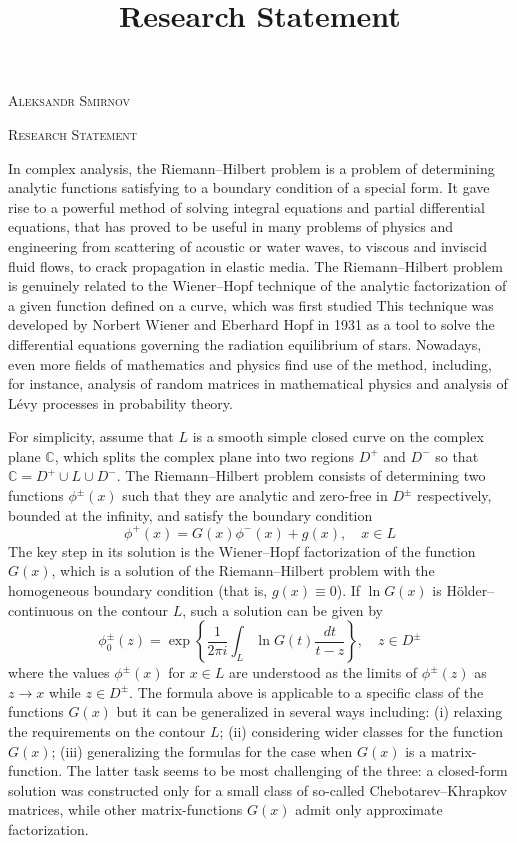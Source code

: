 \documentclass[11pt]{amsart}
\title{Research Statement}
\begin{document}
\begin{center}
	\textsc{Aleksandr Smirnov}
    
    \textsc{Research Statement}
\end{center}

\bigskip

In complex analysis, the Riemann--Hilbert problem is a problem of determining analytic functions satisfying to a boundary condition of a special form. It gave rise to a powerful method of solving integral equations and partial differential equations, that has proved to be useful in many problems of physics and engineering from scattering of acoustic or water waves, to viscous and inviscid fluid flows, to crack propagation in elastic media. The Riemann--Hilbert problem is genuinely related to the Wiener--Hopf technique of the analytic factorization of a given function defined on a curve, which was first studied This technique was developed by Norbert Wiener and Eberhard Hopf in 1931 as a tool to solve the differential equations governing the radiation equilibrium of stars. Nowadays, even more fields of mathematics and physics find use of the method, including, for instance, analysis of random matrices in mathematical physics and analysis of L\'evy processes in probability theory.

For simplicity, assume that $L$ is a smooth simple closed curve on the complex plane $\mathbb C$, which splits the complex plane into two  regions $D^+$ and $D^-$ so that $\mathbb C=D^+\cup L\cup D^-$. The Riemann--Hilbert problem consists of determining two functions $\phi^\pm(x)$ such that they are analytic and zero-free in $D^\pm$ respectively, bounded at the infinity, and satisfy the boundary condition
$$
	\phi^+(x)=G(x)\phi^-(x)+g(x),\quad x\in L
$$
The key step in its solution is the Wiener--Hopf factorization of the function $G(x)$, which is a solution of the Riemann--Hilbert problem with the homogeneous boundary condition (that is, $g(x)\equiv 0$). If $\ln G(x)$ is H\"older--continuous on the contour $L$, such a solution can be given by
$$
	\phi_0^\pm(z)=\exp\left\{\frac1{2\pi i}\int_{L}\ln G(t)\frac{dt}{t-z}\right\},\quad z\in D^\pm
$$
where the values $\phi^\pm(x)$ for $x\in L$ are understood as the limits of $\phi^\pm(z)$ as $z\to x$ while $z\in D^\pm$. The formula above is applicable to a specific class of the functions $G(x)$ but it can be generalized in several ways including: (i) relaxing the requirements on the contour $L$; (ii) considering wider classes for the function $G(x)$; (iii) generalizing the formulas for the case when $G(x)$ is a matrix-function. The latter task seems to be most challenging of the three: a closed-form solution was constructed only for a small class of so-called Chebotarev--Khrapkov matrices, while other matrix-functions $G(x)$ admit only approximate factorization.
\end{document}
